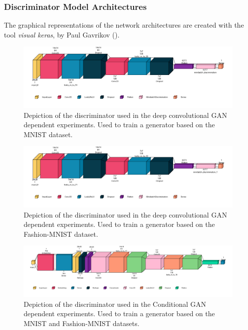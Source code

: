 \subsubsection{Discriminator Model Architectures}\label{appendix_discriminator_architectures}
The graphical representations of the network architectures are created with the tool \textit{visual keras}, by Paul Gavrikov (\cite{Gavrikov2020VisualKeras}).

\begin{figure}[htbp]
    \centering
    \includegraphics[width=.9\textwidth]{abb/netron_network_archs/define_vanilla_mnist_disc.png}
    \caption{Depiction of the discriminator used in the deep convolutional GAN dependent experiments. Used to train a generator based on the MNIST dataset.}
    \label{fig:figure_disc_arch_vanilla_mnist}
\end{figure}

\begin{figure}[htbp]
    \centering
    \includegraphics[width=.9\textwidth]{abb/netron_network_archs/define_vanilla_fashion_mnist_disc.png}
    \caption{Depiction of the discriminator used in the deep convolutional GAN dependent experiments. Used to train a generator based on the Fashion-MNIST dataset.}
    \label{fig:figure_disc_arch_vanilla_fashion}
\end{figure}

\begin{figure}[htbp]
    \centering
    \vspace{-2em}
    \includegraphics[width=.9\textwidth]{abb/netron_network_archs/define_conditional_mnists_disc.png}
    \caption{Depiction of the discriminator used in the Conditional GAN dependent experiments. Used to train a generator based on the MNIST and Fashion-MNIST datasets.}
    \label{fig:figure_disc_arch_conditional}
\end{figure}

